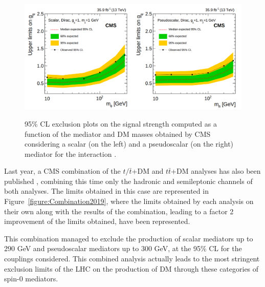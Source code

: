 \documentclass[a4paper, 10pt, openright]{report}
\begin{document}
\begin{figure}[htbp]
\begin{center}
\includegraphics[width=15cm, height=6.2cm]{figs/CMSttbarExclusion.png}
\caption{95\% \ac{CL} exclusion plots on the signal strength computed as a function of the mediator and \ac{DM} masses obtained by \ac{CMS} considering a scalar (on the left) and a pseudoscalar (on the right) mediator for the interaction \cite{PreviousDoubleTopAllLep13CMS}.}
\label{figure:CMSttbarExclusion}
\end{center}
\end{figure}

Last year, a \ac{CMS} combination of the $t/\bar t$+DM and $t \bar t$+DM analyses has also been published \cite{PreviousSingleDoubleTopAllLep13CMS}, combining this time only the hadronic and semileptonic channels of both analyses. The limits obtained in this case are represented in Figure~\ref{figure:Combination2019}, where the limits obtained by each analysis on their own along with the results of the combination, leading to a factor 2 improvement of the limits obtained, have been represented. 

This combination managed to exclude the production of scalar mediators up to 290 GeV and pseudoscalar mediators up to 300 GeV, at the 95\% \ac{CL} for the couplings considered. This combined analysis actually leads to the most stringent exclusion limits of the \ac{LHC} on the production of \ac{DM} through these categories of spin-0 mediators.
\end{document}
